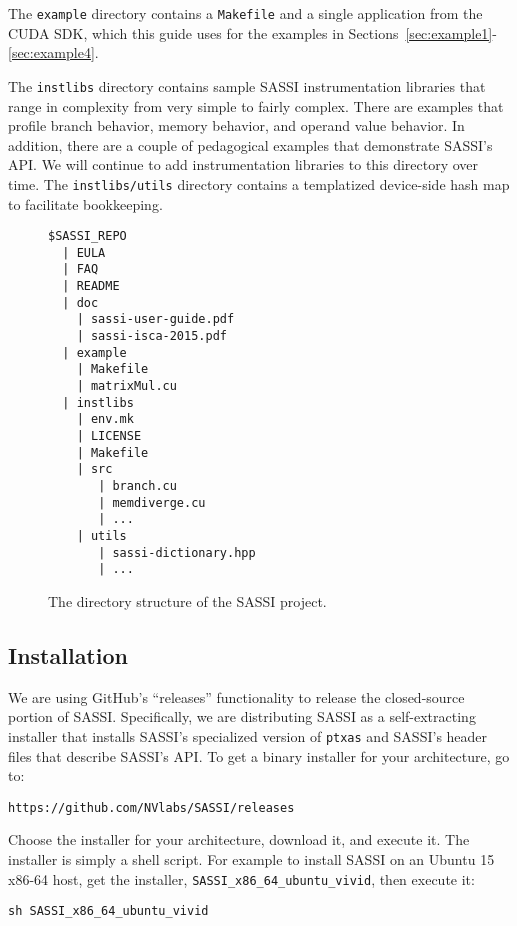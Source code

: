 The \texttt{example} directory contains a \texttt{Makefile} and a
single application from the CUDA SDK, which this guide uses for the
examples in Sections~\ref{sec:example1}-\ref{sec:example4}.

The \texttt{instlibs} directory contains sample SASSI instrumentation
libraries that range in complexity from very simple to fairly complex.
There are examples that profile branch behavior, memory behavior, and
operand value behavior.  In addition, there are a couple of
pedagogical examples that demonstrate SASSI's API.  We will continue
to add instrumentation libraries to this directory over time.  The
\texttt{instlibs/utils} directory contains a templatized device-side
hash map to facilitate bookkeeping.

\begin{figure*}
\center
\begin{verbatim}
$SASSI_REPO
  | EULA
  | FAQ
  | README
  | doc
    | sassi-user-guide.pdf
    | sassi-isca-2015.pdf
  | example
    | Makefile
    | matrixMul.cu 
  | instlibs
    | env.mk
    | LICENSE
    | Makefile
    | src
       | branch.cu
       | memdiverge.cu
       | ...
    | utils
       | sassi-dictionary.hpp
       | ...
\end{verbatim}
\caption{The directory structure of the SASSI project.}
\label{fig:structure}
\end{figure*}

\subsection{Installation}

We are using GitHub's ``releases'' functionality to release the
closed-source portion of SASSI.  Specifically, we are distributing
SASSI as a self-extracting installer that installs SASSI's specialized
version of \texttt{ptxas} and SASSI's header files that describe
SASSI's API.  To get a binary installer for your architecture, go to:\\
\begin{center}
\texttt{https://github.com/NVlabs/SASSI/releases}
\end{center}
Choose the installer for your architecture, download it, and execute
it.  The installer is simply a shell script. For example to install SASSI
on an Ubuntu 15 x86-64 host, get the installer,
\texttt{SASSI\_x86\_64\_ubuntu\_vivid}, then execute it:
\begin{center}
\texttt{sh SASSI\_x86\_64\_ubuntu\_vivid}
\end{center}

